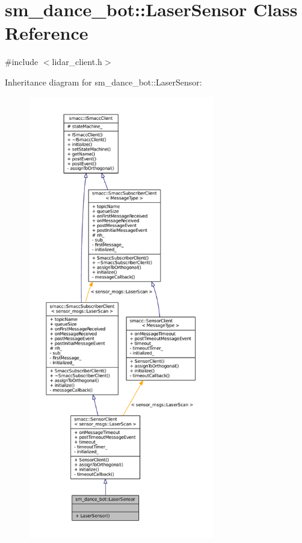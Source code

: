 \hypertarget{classsm__dance__bot_1_1LaserSensor}{}\section{sm\+\_\+dance\+\_\+bot\+:\+:Laser\+Sensor Class Reference}
\label{classsm__dance__bot_1_1LaserSensor}


{\ttfamily \#include $<$lidar\+\_\+client.\+h$>$}



Inheritance diagram for sm\+\_\+dance\+\_\+bot\+:\+:Laser\+Sensor\+:
\nopagebreak
\begin{figure}[H]
\begin{center}
\leavevmode
\includegraphics[height=550pt]{classsm__dance__bot_1_1LaserSensor__inherit__graph}
\end{center}
\end{figure}


